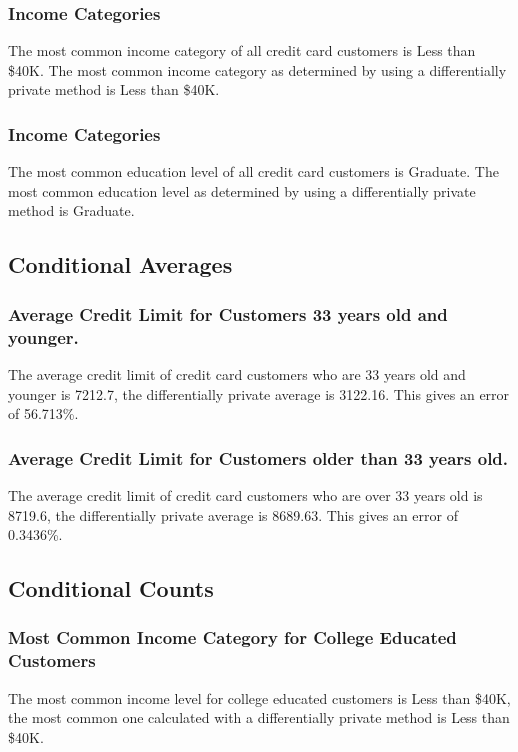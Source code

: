 \documentclass{article}%
\begin{document}
\subsubsection{Income Categories}%
\label{ssubsec:IncomeCategories}%
The most common income category of all credit card customers is Less than \$40K. The most common income category as determined by using a differentially private method is Less than \$40K.

%
\subsubsection{Income Categories}%
\label{ssubsec:IncomeCategories}%
The most common education level of all credit card customers is Graduate. The most common education level as determined by using a differentially private method is Graduate.

%
\subsection{Conditional Averages}%
\label{subsec:ConditionalAverages}%
\subsubsection{Average Credit Limit for Customers 33 years old and younger.}%
\label{ssubsec:AverageCreditLimitforCustomers33yearsoldandyounger.}%
The average credit limit of credit card customers who are 33 years old and younger is 7212.7, the differentially private average is 3122.16. This gives an error of 56.713\%.

%
\subsubsection{Average Credit Limit for Customers older than 33 years old.}%
\label{ssubsec:AverageCreditLimitforCustomersolderthan33yearsold.}%
The average credit limit of credit card customers who are over 33 years old is 8719.6, the differentially private average is 8689.63. This gives an error of 0.3436\%.

%
\subsection{Conditional Counts}%
\label{subsec:ConditionalCounts}%
\subsubsection{Most Common Income Category for College Educated Customers}%
\label{ssubsec:MostCommonIncomeCategoryforCollegeEducatedCustomers}%
The most common income level for college educated customers is Less than \$40K, the most common one calculated with a differentially private method is Less than \$40K. 
\end{document}
